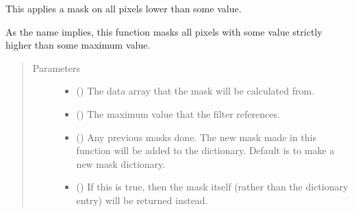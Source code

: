 \documentclass[letterpaper,10pt,english]{sphinxmanual}
\begin{document}

\begin{fulllineitems}
\label{\detokenize{python_docstrings/IfA_Smeargle.echo.masks.masks_echo200:IfA_Smeargle.echo.masks.masks_echo200.echo271_maximum_cut}}
This applies a mask on all pixels lower than some value.

As the name implies, this function masks all pixels with some value
strictly higher than some maximum value.
\begin{quote}\begin{description}
\item[{Parameters}] \leavevmode\begin{itemize}
\item {} 
 () \textendash{} The data array that the mask will be calculated from.

\item {} 
 () \textendash{} The maximum value that the filter references.

\item {} 
 (\sphinxstyleliteralemphasis{\sphinxupquote{ (}}\sphinxstyleliteralemphasis{\sphinxupquote{)}}) \textendash{} Any previous masks done. The new mask made in this function will be
added to the dictionary. Default is to make a new mask dictionary.

\item {} 
 (\sphinxstyleliteralemphasis{\sphinxupquote{ (}}\sphinxstyleliteralemphasis{\sphinxupquote{)}}) \textendash{} If this is true, then the mask itself (rather than the dictionary
entry) will be returned instead.


\end{itemize}
\end{description}
\end{quote}
\end{fulllineitems}
\end{document}
